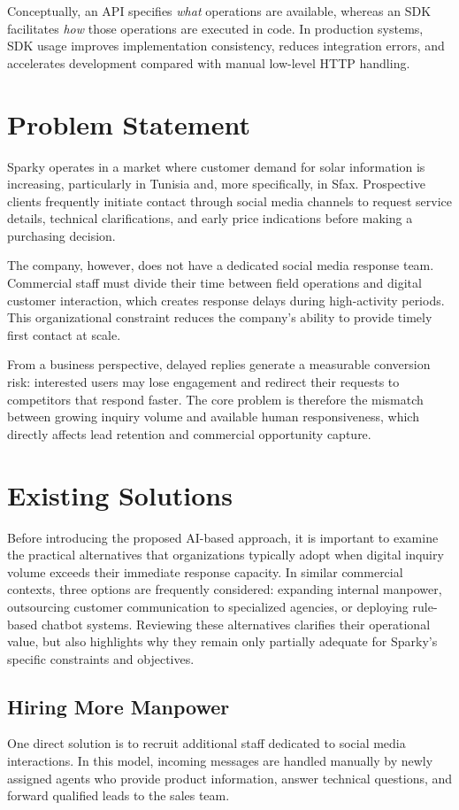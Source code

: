 Conceptually, an API specifies \textit{what} operations are available, whereas an SDK facilitates \textit{how} those operations are executed in code. In production systems, SDK usage improves implementation consistency, reduces integration errors, and accelerates development compared with manual low-level HTTP handling.

\section{Problem Statement}

Sparky operates in a market where customer demand for solar information is increasing, particularly in Tunisia and, more specifically, in Sfax. Prospective clients frequently initiate contact through social media channels to request service details, technical clarifications, and early price indications before making a purchasing decision.

The company, however, does not have a dedicated social media response team. Commercial staff must divide their time between field operations and digital customer interaction, which creates response delays during high-activity periods. This organizational constraint reduces the company's ability to provide timely first contact at scale.

From a business perspective, delayed replies generate a measurable conversion risk: interested users may lose engagement and redirect their requests to competitors that respond faster. The core problem is therefore the mismatch between growing inquiry volume and available human responsiveness, which directly affects lead retention and commercial opportunity capture.

\section{Existing Solutions}
Before introducing the proposed AI-based approach, it is important to examine the practical alternatives that organizations typically adopt when digital inquiry volume exceeds their immediate response capacity. In similar commercial contexts, three options are frequently considered: expanding internal manpower, outsourcing customer communication to specialized agencies, or deploying rule-based chatbot systems. Reviewing these alternatives clarifies their operational value, but also highlights why they remain only partially adequate for Sparky's specific constraints and objectives.

\subsection{Hiring More Manpower}
One direct solution is to recruit additional staff dedicated to social media interactions. In this model, incoming messages are handled manually by newly assigned agents who provide product information, answer technical questions, and forward qualified leads to the sales team.

